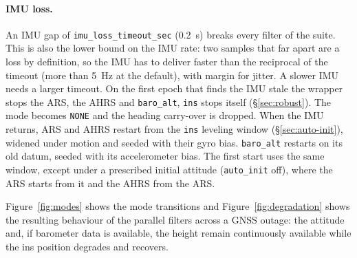 \documentclass[11pt,a4paper]{article}
\newcommand{\code}[1]{\texttt{#1}}
\begin{document}
\paragraph{IMU loss.}
\label{sec:suite_imu_loss}
An IMU gap of \code{imu\_\allowbreak{}loss\_\allowbreak{}timeout\_\allowbreak{}sec}
(\SI{0.2}{\second}) breaks every filter of the suite. This is also the lower
bound on the IMU rate: two samples that far apart are a loss by definition,
so the IMU has to deliver faster than the reciprocal of the timeout (more
than \SI{5}{\hertz} at the default), with margin for jitter. A slower IMU
needs a larger timeout. On the first epoch that
finds the IMU stale the wrapper stops the ARS, the AHRS and
\code{baro\_\allowbreak{}alt}, \code{ins} stops itself (\S\ref{sec:robust}).
The mode becomes \code{NONE} and the heading carry-over is dropped. When the
IMU returns, ARS and AHRS restart from the \code{ins} leveling window
(\S\ref{sec:auto-init}), widened under motion and seeded with their gyro bias.
\code{baro\_\allowbreak{}alt} restarts on its old datum, seeded with its
accelerometer bias. The first start uses the same window, except under a
prescribed initial attitude (\code{auto\_\allowbreak{}init} off), where the
ARS starts from it and the AHRS from the ARS.

Figure~\ref{fig:modes} shows the mode transitions and
Figure~\ref{fig:degradation} shows the resulting behaviour of the parallel
filters across a GNSS outage: the attitude and, if barometer data is available,
the height remain continuously available while the ins position degrades and
recovers.
\end{document}
